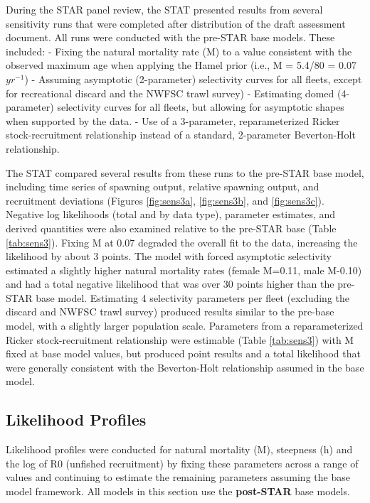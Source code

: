 \documentclass[
  english,
  a4paper,
]{article}
\begin{document}
During the STAR panel review, the STAT presented results from several sensitivity runs that were completed after distribution of the draft assessment document. All runs were conducted with the pre-STAR base models. These included:
- Fixing the natural mortality rate (M) to a value consistent with the observed maximum age when applying the Hamel prior (i.e., M = 5.4/80 = 0.07 \(yr^{-1}\))
- Assuming asymptotic (2-parameter) selectivity curves for all fleets, except for recreational discard and the NWFSC trawl survey)
- Estimating domed (4-parameter) selectivity curves for all fleets, but allowing for asymptotic shapes when supported by the data.
- Use of a 3-parameter, reparameterized Ricker stock-recruitment relationship instead of a standard, 2-parameter Beverton-Holt relationship.

The STAT compared several results from these runs to the pre-STAR base model, including time series of spawning output, relative spawning output, and recruitment deviations (Figures \ref{fig:sens3a}, \ref{fig:sens3b}, and \ref{fig:sens3c}). Negative log likelihoods (total and by data type), parameter estimates, and derived quantities were also examined relative to the pre-STAR base (Table \ref{tab:sens3}). Fixing M at 0.07 degraded the overall fit to the data, increasing the likelihood by about 3 points. The model with forced asymptotic selectivity estimated a slightly higher natural mortality rates (female M=0.11, male M-0.10) and had a total negative likelihood that was over 30 points higher than the pre-STAR base model. Estimating 4 selectivity parameters per fleet (excluding the discard and NWFSC trawl survey) produced results similar to the pre-base model, with a slightly larger population scale. Parameters from a reparameterized Ricker stock-recruitment relationship were estimable (Table \ref{tab:sens3}) with M fixed at base model values, but produced point results and a total likelihood that were generally consistent with the Beverton-Holt relationship assumed in the base model.

\hypertarget{likelihood-profiles}{%
\subsection{Likelihood Profiles}\label{likelihood-profiles}}

Likelihood profiles were conducted for natural mortality (M), steepness (h) and the log of R0 (unfished recruitment) by fixing these parameters across a range of values and continuing to estimate the remaining parameters assuming the base model framework. All models in this section use the \textbf{post-STAR} base models.
\end{document}

